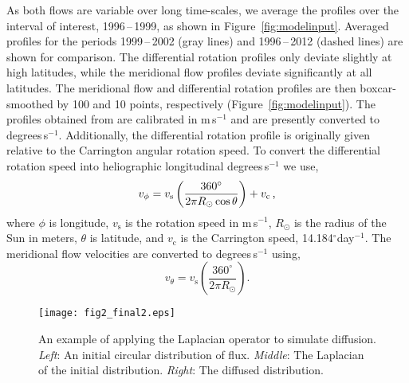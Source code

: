 As both flows are variable over long time-scales, we average the profiles over the interval of interest, 1996\,--\,1999, as shown in Figure~\ref{fig:modelinput}. Averaged profiles for the periods 1999\,--\,2002 (gray lines) and 1996\,--\,2012 (dashed lines) are shown for comparison. The differential rotation profiles only deviate slightly at high latitudes, while the meridional flow profiles deviate significantly at all latitudes. The meridional flow and differential rotation profiles are then boxcar-smoothed by 100 and 10 points, respectively (Figure~\ref{fig:modelinput}). The profiles obtained from \cite{Hathaway:2011} are calibrated in m\,s$^{-1}$ and are presently converted to degrees\,s$^{-1}$. Additionally, the differential rotation profile is originally given relative to the Carrington angular rotation speed. To convert the differential rotation speed into heliographic longitudinal degrees\,s$^{-1}$ we use,
\begin{equation}\label{eqn:convdiffrotdeg}
v_{\phi}=v_\mathrm{s} \left( \frac{360^{\circ}}{2 \pi R_{\odot} \cos{\theta}} \right) + v_{\mathrm{c}} \mbox{\,,}
\end{equation}
where $\phi$ is longitude, $v_\mathrm{s}$ is the rotation speed in m\,s$^{-1}$, $R_{\odot}$ is the radius of the Sun in meters, $\theta$ is latitude, and $v_{\mathrm{c}}$ is the Carrington speed, 14.184$^\circ$day$^{-1}$. The meridional flow velocities are converted to degrees\,s$^{-1}$ using,
\begin{equation}\label{eqn:convmeriddeg}
v_{\theta}=v_\mathrm{s} \left( \frac{360^{\circ}}{2 \pi R_{\odot}} \right) \mbox{.}
\end{equation}

\begin{table}
\caption[The elements of the discrete Laplacian operator kernel.]{The elements of the discrete Laplacian operator kernel. A 3$\times$3 array, with the values shown in the table, is convolved with an image to produce the discrete version of $\nabla^2$.}\label{table:lapker}
\end{table}

 \begin{figure}[!t]    %
   \centerline{\texttt{[image: fig2\_final2.eps]}
              }
              \caption[An example of applying the Laplacian operator to simulate diffusion.]{An example of applying the Laplacian operator to simulate diffusion. \emph{Left}: An initial circular distribution of flux. \emph{Middle}: The Laplacian of the initial distribution. \emph{Right}: The diffused distribution.}
   \label{fig:laplaceexamp}
   \end{figure}

